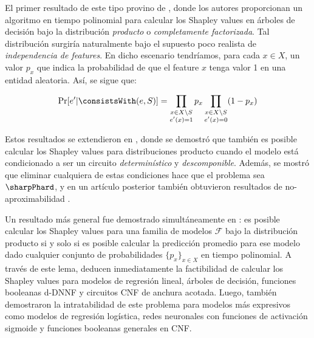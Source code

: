 
El primer resultado de este tipo provino de \cite{lundberg2020local}, donde los autores proporcionan un algoritmo en tiempo polinomial para calcular los Shapley values en árboles de decisión bajo la distribución \textit{producto} o \textit{completamente factorizada}. Tal distribución surgiría naturalmente bajo el supuesto poco realista de \textit{independencia de features}. En dicho escenario tendríamos, para cada \(x \in X\), un valor \(p_x\) que indica la probabilidad de que el feature \(x\) tenga valor 1 en una entidad aleatoria. Así, se sigue que:

\[
\Pr[e' | \consistsWith(e, S)] = \prod_{\substack{x \in X \setminus S \\ e'(x) = 1}} p_x \prod_{\substack{x \in X \setminus S \\ e'(x) = 0}} (1-p_x) 
\]

Estos resultados se extendieron en \cite{arenas2021tractability}, donde se demostró que también es posible calcular los Shapley values para distribuciones producto cuando el modelo está condicionado a ser un circuito \textit{determinístico} y \textit{descomponible}. Además, se mostró que eliminar cualquiera de estas condiciones hace que el problema sea \(\sharpPhard\), y en un artículo posterior también obtuvieron resultados de no-aproximabilidad \cite{arenas2023complexity}.

Un resultado más general fue demostrado simultáneamente en \cite{van2022tractability}: es posible calcular los Shapley values para una familia de modelos \(\mathcal{F}\) bajo la distribución producto si y solo si es posible calcular la predicción promedio para ese modelo dado cualquier conjunto de probabilidades \(\{p_x\}_{x \in X}\) en tiempo polinomial. A través de este lema, deducen inmediatamente la factibilidad de calcular los Shapley values para modelos de regresión lineal, árboles de decisión, funciones booleanas d-DNNF y circuitos CNF de anchura acotada. Luego, también demostraron la intratabilidad de este problema para modelos más expresivos como modelos de regresión logística, redes neuronales con funciones de activación sigmoide y funciones booleanas generales en CNF.

